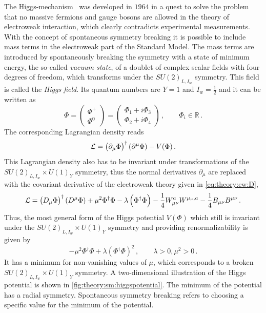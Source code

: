 The Higgs-mechanism~\cite{HiggsMecha1,HiggsMecha2,HiggsMecha3,HiggsMecha4,HiggsMecha5,HiggsMecha6} was
developed in $1964$ in a quest to solve the problem that no massive fermions and gauge bosons are allowed
in the theory of electroweak interaction, which clearly contradicts experimental measurements.
With the concept of spontaneous symmetry breaking it is possible to include mass terms in the electroweak part of the Standard Model.
The mass terms are introduced by spontaneously breaking the symmetry with a state of minimum energy, the so-called \emph{vacuum state},
of a doublet of complex scalar fields with four degrees of freedom, which transforms under the $SU(2)_{L,I_w}$ symmetry.
This field is called the \emph{Higgs field}.
Its quantum numbers are $Y = 1$ and $I_w = \frac{1}{2}$ and it can be written as~\cite{Schmuser}
\begin{equation}
    \Phi =
    \begin{pmatrix}
        \Phi^+ \\ \Phi^0
    \end{pmatrix}
    =
    \begin{pmatrix}
        \Phi_1 + i \Phi_3 \\
        \Phi_2 + i \Phi_4
    \end{pmatrix} \,, \qquad \Phi_i \in \mathbb{R} \,.
\end{equation}
The corresponding Lagrangian density reads
\begin{equation}
    \mathcal{L} = {\left(\partial_\mu\Phi\right)}^\dagger \left(\partial^\mu\Phi\right) - V(\Phi) \,.
\end{equation}
This Lagrangian density also has to be invariant under transformations of the $SU{(2)}_{L,I_w} \times U{(1)}_Y$ symmetry,
thus the normal derivatives $\partial_\mu$ are replaced with the covariant derivative of the electroweak theory given in \cref{eq:theory:ew:D},
\begin{equation}
    \mathcal{L} = {\left(D_\mu\Phi\right)}^\dagger \left(D^\mu\Phi\right) + \mu^2 \Phi^\dagger \Phi - \lambda \left(\Phi^\dagger \Phi\right) - \frac{1}{4} W_{\mu\nu}^a W^{\mu_\nu,a} - \frac{1}{4} B_{\mu\nu} B^{\mu\nu}\,.
\end{equation}
Thus, the most general form of the Higgs potential $V(\Phi)$ which still is invariant under the $SU{(2)}_{L,I_w} \times U{(1)}_Y$ symmetry and providing renormalizability
is given by
\begin{equation}
    - \mu^2 \Phi^\dagger \Phi + \lambda {\left(\Phi^\dagger \Phi\right)}^2 \,, \qquad \lambda > 0 , \mu^2 > 0 \,.
\end{equation}
It has a minimum for non-vanishing values of $\mu$, which corresponds to a broken $SU{(2)}_{L,I_w} \times U{(1)}_Y$ symmetry.
A two-dimensional illustration of the Higgs potential is shown in \cref{fig:theory:sm:higgspotential}.
The minimum of the potential has a radial symmetry.
Spontaneous symmetry breaking refers to choosing a specific value for the minimum of the potential.

